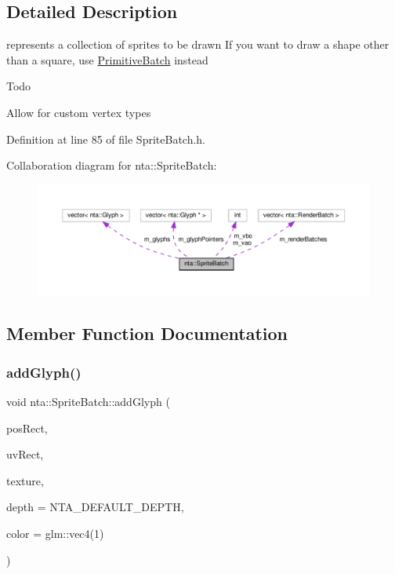 \subsection{Detailed Description}
represents a collection of sprites to be drawn If you want to draw a shape other than a square, use \hyperlink{classnta_1_1PrimitiveBatch}{Primitive\+Batch} instead \begin{DoxyRefDesc}{Todo}
\item[\hyperlink{todo__todo000013}{Todo}]Allow for custom vertex types \end{DoxyRefDesc}


Definition at line 85 of file Sprite\+Batch.\+h.



Collaboration diagram for nta\+:\+:Sprite\+Batch\+:\nopagebreak
\begin{figure}[H]
\begin{center}
\leavevmode
\includegraphics[width=350pt]{da/dc5/classnta_1_1SpriteBatch__coll__graph}
\end{center}
\end{figure}


\subsection{Member Function Documentation}
\mbox{\label{classnta_1_1SpriteBatch_aa703fb92d0bd42865c21fdfb2625660d}} 
\subsubsection{\texorpdfstring{add\+Glyph()}{addGlyph()}}
{\footnotesize\ttfamily void nta\+::\+Sprite\+Batch\+::add\+Glyph (\begin{DoxyParamCaption}\item[{crvec4}]{pos\+Rect,  }\item[{crvec4}]{uv\+Rect,  }\item[{G\+Luint}]{texture,  }\item[{float}]{depth = {\ttfamily NTA\+\_\+DEFAULT\+\_\+DEPTH},  }\item[{crvec4}]{color = {\ttfamily glm\+:\+:vec4(1)} }\end{DoxyParamCaption})}

